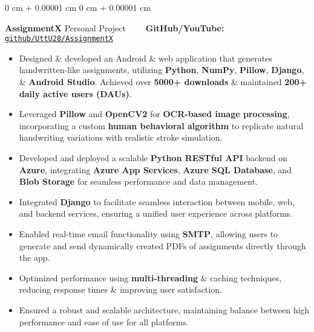 \documentclass[10pt, letterpaper]{article}
\newenvironment{highlights}{
    \begin{itemize}[
        topsep=0.10 cm,
        parsep=0.10 cm,
        partopsep=0pt,
        itemsep=0pt,
        leftmargin=0 cm + 10pt
    ]
}{
    \end{itemize}
} %
\newenvironment{onecolentry}{
    \begin{adjustwidth}{
        0 cm + 0.00001 cm
    }{
        0 cm + 0.00001 cm
    }
}{
    \end{adjustwidth}
} %
\begin{document}
\begin{onecolentry}
	\textbf{AssignmentX} \hfill Personal Project \ \ \ \ \textbf{GitHub/YouTube:} \href{https://github.com/UttU28/AssignmentX}{\texttt{github/UttU28/AssignmentX}}
	\begin{highlights}
		\item Designed \& developed an Android \& web application that generates handwritten-like assignments, utilizing \textbf{Python}, \textbf{NumPy}, \textbf{Pillow}, \textbf{Django}, \& \textbf{Android Studio}. Achieved over \textbf{5000+ downloads} \& maintained \textbf{200+ daily active users (DAUs)}.
		\item Leveraged \textbf{Pillow} and \textbf{OpenCV2} for \textbf{OCR-based image processing}, incorporating a custom \textbf{human behavioral algorithm} to replicate natural handwriting variations with realistic stroke simulation.
		\item Developed and deployed a scalable \textbf{Python RESTful API} backend on \textbf{Azure}, integrating \textbf{Azure App Services}, \textbf{Azure SQL Database}, and \textbf{Blob Storage} for seamless performance and data management.
		\item Integrated \textbf{Django} to facilitate seamless interaction between mobile, web, and backend services, ensuring a unified user experience across platforms.
		\item Enabled real-time email functionality using \textbf{SMTP}, allowing users to generate and send dynamically created PDFs of assignments directly through the app.
		\item Optimized performance using \textbf{multi-threading} \& caching techniques, reducing response times \& improving user satisfaction.
		\item Ensured a robust and scalable architecture, maintaining balance between high performance and ease of use for all platforms.
	\end{highlights}
\end{onecolentry}
\end{document}
